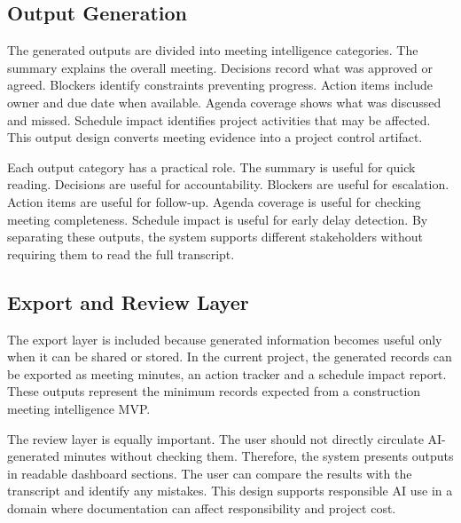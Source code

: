 \documentclass[11pt,a4paper]{article}
\begin{document}
\subsection{Output Generation}

The generated outputs are divided into meeting intelligence categories. The summary explains the overall meeting. Decisions record what was approved or agreed. Blockers identify constraints preventing progress. Action items include owner and due date when available. Agenda coverage shows what was discussed and missed. Schedule impact identifies project activities that may be affected. This output design converts meeting evidence into a project control artifact.

Each output category has a practical role. The summary is useful for quick reading. Decisions are useful for accountability. Blockers are useful for escalation. Action items are useful for follow-up. Agenda coverage is useful for checking meeting completeness. Schedule impact is useful for early delay detection. By separating these outputs, the system supports different stakeholders without requiring them to read the full transcript.

\subsection{Export and Review Layer}

The export layer is included because generated information becomes useful only when it can be shared or stored. In the current project, the generated records can be exported as meeting minutes, an action tracker and a schedule impact report. These outputs represent the minimum records expected from a construction meeting intelligence MVP.

The review layer is equally important. The user should not directly circulate AI-generated minutes without checking them. Therefore, the system presents outputs in readable dashboard sections. The user can compare the results with the transcript and identify any mistakes. This design supports responsible AI use in a domain where documentation can affect responsibility and project cost.
\end{document}
